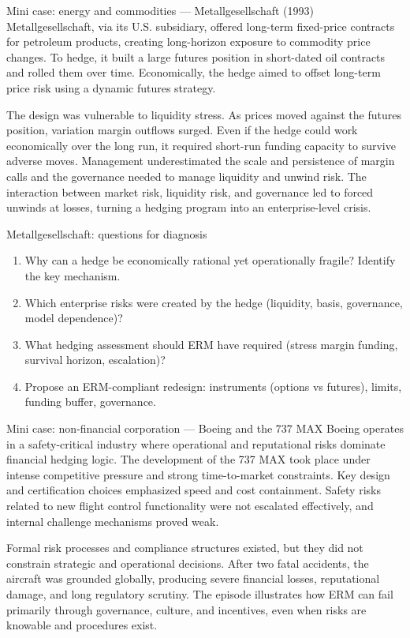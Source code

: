 \documentclass[aspectratio=169, 10pt]{beamer} %
\begin{document}
\begin{frame}{Mini case: energy and commodities — Metallgesellschaft (1993)}
Metallgesellschaft, via its U.S. subsidiary, offered long-term fixed-price contracts
for petroleum products, creating long-horizon exposure to commodity price changes.
To hedge, it built a large futures position in short-dated oil contracts and rolled
them over time. Economically, the hedge aimed to offset long-term price risk using a
dynamic futures strategy.

The design was vulnerable to liquidity stress. As prices moved against the futures
position, variation margin outflows surged. Even if the hedge could work economically
over the long run, it required short-run funding capacity to survive adverse moves.
Management underestimated the scale and persistence of margin calls and the governance
needed to manage liquidity and unwind risk. The interaction between market risk,
liquidity risk, and governance led to forced unwinds at losses, turning a hedging
program into an enterprise-level crisis.
\end{frame}

\begin{frame}{Metallgesellschaft: questions for diagnosis}
\begin{enumerate}
  \item Why can a hedge be economically rational yet operationally fragile? Identify the key mechanism.
  \item Which enterprise risks were created by the hedge (liquidity, basis, governance, model dependence)?
  \item What hedging assessment should ERM have required (stress margin funding, survival horizon, escalation)?
  \item Propose an ERM-compliant redesign: instruments (options vs futures), limits, funding buffer, governance.
\end{enumerate}
\end{frame}

\begin{frame}{Mini case: non-financial corporation — Boeing and the 737 MAX}
Boeing operates in a safety-critical industry where operational and reputational
risks dominate financial hedging logic. The development of the 737 MAX took place
under intense competitive pressure and strong time-to-market constraints. Key design
and certification choices emphasized speed and cost containment. Safety risks related
to new flight control functionality were not escalated effectively, and internal
challenge mechanisms proved weak.

Formal risk processes and compliance structures existed, but they did not constrain
strategic and operational decisions. After two fatal accidents, the aircraft was
grounded globally, producing severe financial losses, reputational damage, and long
regulatory scrutiny. The episode illustrates how ERM can fail primarily through
governance, culture, and incentives, even when risks are knowable and procedures exist.
\end{frame}
\end{document}
